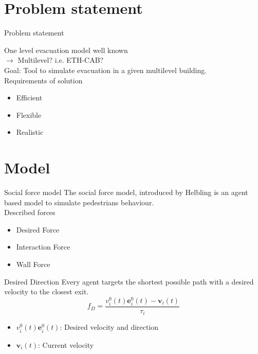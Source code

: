 \section{Problem statement}

\begin{frame}{Problem statement}

One level evacuation model well known \\
$\rightarrow$  Multilevel? i.e. ETH-CAB?\\
Goal: Tool to simulate evacuation in a given multilevel building.\\
Requirements of solution
\begin{itemize}
\item Efficient
\item Flexible
\item Realistic
\end{itemize}

\end{frame}


\section{Model}

\begin{frame}{Social force model}
The social force model, introduced by Helbling is an agent based model to simulate pedestrians behaviour.\\
Described forces
\begin{itemize}
\item Desired Force
\item Interaction Force
\item Wall Force
\end{itemize}
\end{frame}

\begin{frame}{Desired Direction}
Every agent targets the shortest possible path with a desired velocity to the closest exit.
\begin{equation*}
f_{D}=\frac{v_{i}^{0}(t)\mathbf{e}_{i}^{0}(t)-\mathbf{v}_{i}(t)}{\tau_{i}}
\end{equation*}
\begin{itemize}
\item $v_{i}^{0}(t)\mathbf{e}_{i}^{0}(t)$: Desired velocity and direction
\item $\mathbf{v}_{i}(t)$: Current velocity
\end{itemize}
\end{frame}

